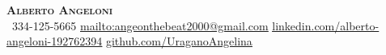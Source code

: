\begin{center}
    \textbf{\Huge \scshape Alberto Angeloni} \\ \vspace{1pt}
     \ \small 334-125-5665 \quad
    \href{mailto:angeonthebeat2000@gmail.com}{ \underline{mailto:angeonthebeat2000@gmail.com}} \quad
    \href{https://www.linkedin.com/in/alberto-angeloni-192762394}{ \underline{linkedin.com/alberto-angeloni-192762394}} \quad
    \href{https://github.com/UraganoAngelina}{ \underline{github.com/UraganoAngelina}}
\end{center}